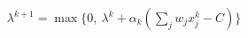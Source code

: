 \documentclass[preview]{standalone}
\begin{document}
\begin{align*}
\lambda^{k+1} = \max\{0,\ \lambda^k + \alpha_k ( \sum_j w_j x_j^k - C )\}
\end{align*}
\end{document}
